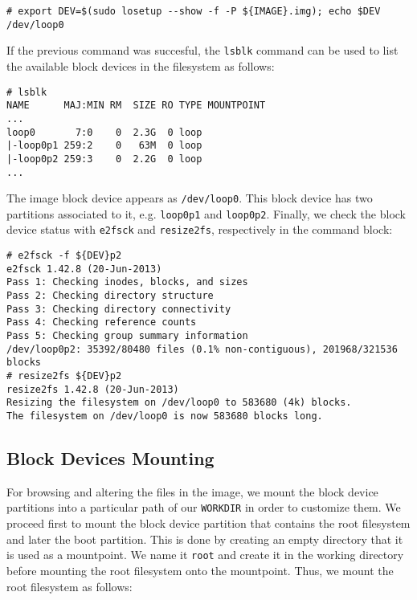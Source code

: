 \begin{lstlisting}[]
# export DEV=$(sudo losetup --show -f -P ${IMAGE}.img); echo $DEV
/dev/loop0
\end{lstlisting}
\FloatBarrier
\vspace{-5mm}

If the previous command was succesful, the \texttt{lsblk} command can be used
to list the available block devices in the filesystem as follows:

\begin{lstlisting}[]
# lsblk
NAME      MAJ:MIN RM  SIZE RO TYPE MOUNTPOINT
...
loop0       7:0    0  2.3G  0 loop
|-loop0p1 259:2    0   63M  0 loop
|-loop0p2 259:3    0  2.2G  0 loop
...
\end{lstlisting}
\FloatBarrier
\vspace{-5mm}

The image block device appears as \texttt{/dev/loop0}. This block device has
two partitions associated to it, e.g. \texttt{loop0p1} and \texttt{loop0p2}.
Finally, we check the block device status with \texttt{e2fsck} and
\texttt{resize2fs}, respectively in the command block:

\begin{lstlisting}[]
# e2fsck -f ${DEV}p2
e2fsck 1.42.8 (20-Jun-2013)
Pass 1: Checking inodes, blocks, and sizes
Pass 2: Checking directory structure
Pass 3: Checking directory connectivity
Pass 4: Checking reference counts
Pass 5: Checking group summary information
/dev/loop0p2: 35392/80480 files (0.1% non-contiguous), 201968/321536 blocks
# resize2fs ${DEV}p2
resize2fs 1.42.8 (20-Jun-2013)
Resizing the filesystem on /dev/loop0 to 583680 (4k) blocks.
The filesystem on /dev/loop0 is now 583680 blocks long.
\end{lstlisting}
\FloatBarrier

\subsection{Block Devices Mounting}
For browsing and altering the files in the image, we mount the block
device partitions into a particular path of our \texttt{WORKDIR} in order
to customize them. We proceed first to mount the block device partition that
contains the root filesystem and later the boot partition. This is done by
creating an empty directory that it is used as a mountpoint. We name it
\texttt{root} and create it in the working directory before mounting the
root filesystem onto the mountpoint. Thus, we mount the root filesystem
as follows:

